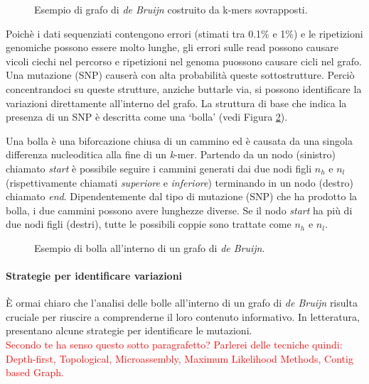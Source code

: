 \documentclass[../main.tex]{subfiles}
\begin{document}
\begin{figure}[h!]
	\centering
  	\captionsetup{justification=centering}
  	\caption{Esempio di grafo di \textit{de Bruijn} costruito da k-mers sovrapposti.}
  	\label{fig:dBG}
\end{figure}

\noindent
Poichè i dati sequenziati contengono errori (stimati tra 0.1\% e 1\%) e le ripetizioni genomiche possono essere molto lunghe, gli errori sulle read possono causare vicoli ciechi nel percorso e ripetizioni nel genoma puossono causare cicli nel grafo. Una mutazione (SNP) causerà con alta probabilità queste sottostrutture. Perciò concentrandoci su queste strutture, anziche buttarle via, si possono identificare la variazioni direttamente all'interno del grafo. La struttura di base che indica la presenza di un SNP è descritta come una `bolla' (vedi Figura \ref{fig:dBG_bubble}).

\begin{definition}
Una bolla è una biforcazione chiusa di un cammino ed è causata da una singola differenza nucleoditica alla fine di un \textit{k}-mer. Partendo da un nodo (sinistro) chiamato \textit{start} è possibile seguire i cammini generati dai due nodi figli $n_h$ e $n_l$ (rispettivamente chiamati \textit{superiore} e \textit{inferiore}) terminando in un nodo (destro) chiamato \textit{end}. Dipendentemente dal tipo di mutazione (SNP) che ha prodotto la bolla, i due cammini possono avere lunghezze diverse. Se il nodo \textit{start} ha più di due nodi figli (destri), tutte le possibili coppie sono trattate come $n_h$ e $n_l$.
\end{definition}

\begin{figure}[h!]
	\centering
  	\captionsetup{justification=centering}
  	\caption{Esempio di bolla all'interno di un grafo di \textit{de Bruijn}.}
  	\label{fig:dBG_bubble}
\end{figure}

\paragraph{Strategie per identificare variazioni} È ormai chiaro che l'analisi delle bolle all'interno di un grafo di \textit{de Bruijn} risulta cruciale per riuscire a comprenderne il loro contenuto informativo. In letteratura, \cite{leggett2014reference} presentano alcune strategie per identificare le mutazioni. \\ \textcolor{red}{Secondo te ha senso questo sotto paragrafetto? Parlerei delle tecniche quindi: Depth-first, Topological, Microassembly, Maximum Likelihood Methods, Contig based Graph.}
\end{document}
